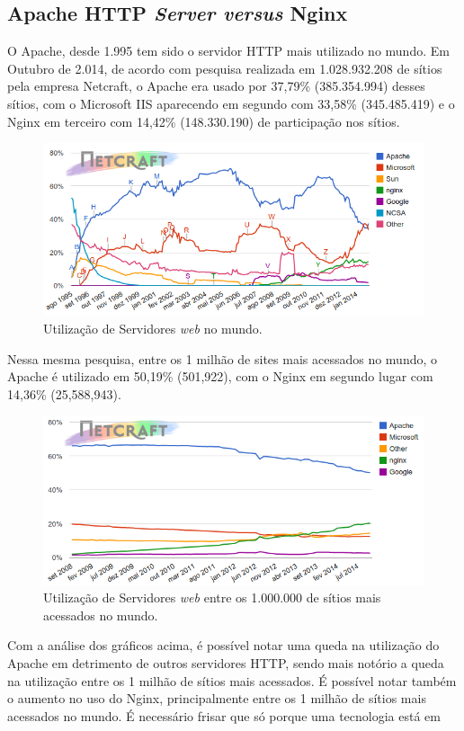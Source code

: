 \subsection{Apache HTTP \textit{Server versus} Nginx}
O Apache, desde 1.995 tem sido o servidor HTTP mais utilizado no mundo. Em Outubro de 2.014, de acordo com pesquisa realizada em 1.028.932.208 de sítios pela empresa Netcraft, o Apache era usado por 37,79\% (385.354.994) desses sítios, com o Microsoft IIS aparecendo em segundo com 33,58\% (345.485.419) e o Nginx em terceiro com 14,42\% (148.330.190) de participação nos sítios.\\
\begin{figure}[H]
	\centering
	\includegraphics[width=0.6\linewidth]{figuras/grafico1}
	\caption{Utilização de Servidores \textit{web} no mundo.}
	\label{fig:webservers-utilizacao}
\end{figure}
Nessa mesma pesquisa, entre os 1 milhão de sites mais acessados no mundo, o 
Apache é utilizado em 50,19\% (501,922), com o Nginx em segundo lugar com 
14,36\% (25,588,943).\\
\begin{figure}[H]
	\centering
	\includegraphics[width=0.6\linewidth]{figuras/grafico2} 
	\caption{Utilização de Servidores \textit{web} entre os 1.000.000 de sítios mais acessados no mundo.}
	\label{fig:webservers-utilizacao-milhao}
\end{figure}
Com a análise dos gráficos acima, é possível notar uma queda na utilização do 
Apache em detrimento de outros servidores HTTP, sendo mais notório a queda na 
utilização entre os 1 milhão de sítios mais acessados. É possível notar também 
o aumento no uso do Nginx, principalmente entre os 1 milhão de sítios mais 
acessados no mundo. É necessário frisar que só porque uma tecnologia está em 
